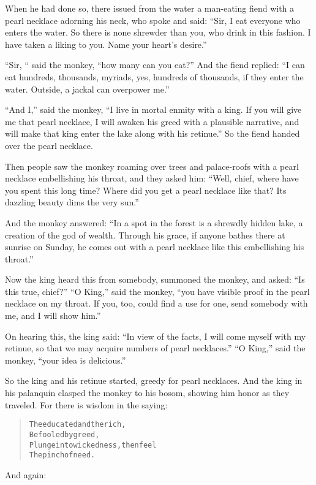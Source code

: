 \documentclass[article, twoside, 14pt]{memoir}
\renewenvironment{verbatim}{%
\begin{quote}%
\vskip -10pt%
\begin{alltt}\normalfont\large}{\end{alltt}%
\end{quote}%
\vskip -10pt
} %
\begin{document}
When he had done so, there issued from the water a man-eating fiend
with a pearl necklace adorning his neck, who spoke and said:
``Sir, I eat everyone who enters the water. So there is none shrewder than you, who drink in this fashion. I have taken a liking to you. Name your heart's desire.''

``Sir, “ said the monkey, “how many can you eat?'' And the fiend
replied:
``I can eat hundreds, thousands, myriads, yes, hundreds of thousands, if they enter the water. Outside, a jackal can overpower me.''

``And I,'' said the monkey,
``I live in mortal enmity with a king. If you will give me that pearl necklace, I will awaken his greed with a plausible narrative, and will make that king enter the lake along with his retinue.''
So the fiend handed over the pearl necklace.

Then people saw the monkey roaming over trees and palace-roofs with
a pearl necklace embellishing his throat, and they asked him:
``Well, chief, where have you spent this long time? Where did you get a pearl necklace like that? Its dazzling beauty dims the very sun.''

And the monkey answered:
``In a spot in the forest is a shrewdly hidden lake, a creation of the god of wealth. Through his grace, if anyone bathes there at sunrise on Sunday, he comes out with a pearl necklace like this embellishing his throat.''

Now the king heard this from somebody, summoned the monkey, and
asked: ``Is this true, chief?'' ``O King,'' said the monkey,
``you have visible proof in the pearl necklace on my throat. If you, too, could find a use for one, send somebody with me, and I will show him.''

On hearing this, the king said:
``In view of the facts, I will come myself with my retinue, so that we may acquire numbers of pearl necklaces.''
``O King,'' said the monkey, ``your idea is delicious.''

So the king and his retinue started, greedy for pearl necklaces.
And the king in his palanquin clasped the monkey to his
bosom, showing him honor as they traveled. For there is wisdom in
the saying:

\begin{verbatim}
The educated and the rich,
    Befooled by greed,
Plunge into wickedness, then feel
    The pinch of need.
\end{verbatim}
And again:
\end{document}
